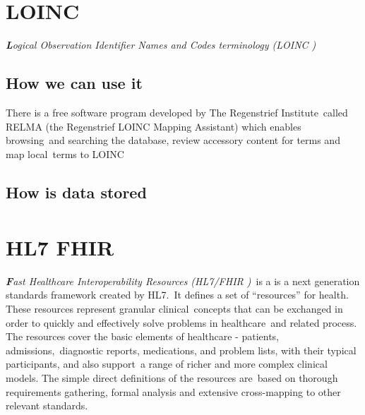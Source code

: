\documentclass[DIV=calc, paper=a4, fontsize=12pt, onecolumn]{scrartcl}	 %
\newcommand{\initial}[1]{ %
\lettrine[lines=3,lhang=0.3,nindent=0em,slope=0em]{
\color{DarkBlue}
{\textbf{\textit{#1}}}}{}}
\begin{document}
  \section[Logical Observation Identifier Names and Codes terminology\
  (LOINC\textsuperscript{\textregistered})] 
  {LOINC\textsuperscript{\textregistered}}
  \label{sec:loinc}
  
  \initial{L}\textit{ogical Observation Identifier Names and Codes terminology (LOINC )}\\



  \subsection{How we can use it}

  There is a free software program developed by The Regenstrief Institute\
  called RELMA (the Regenstrief LOINC Mapping Assistant) which enables browsing\
  and searching the database, review accessory content for terms and map local\
  terms to LOINC \citep{kroth_using_2012} 

  \subsection{How is data stored}


  \section[Fast Healthcare Interoperability Resources (HL7 FHIR\textsuperscript{\texttrademark})]
  {HL7 FHIR \textsuperscript{\texttrademark}}
    \label{sec:fhir}

  \initial{F}\textit{ast Healthcare Interoperability Resources (HL7/FHIR )}\
  is a is a next generation standards framework created by HL7.\
  It defines a set of ``resources'' for health. These resources represent granular clinical\
  concepts that can be exchanged in order to quickly and effectively solve problems in healthcare\
  and related process. The resources cover the basic elements of healthcare - patients, admissions,\
  diagnostic reports, medications, and problem lists, with their typical participants, and also support\
  a range of richer and more complex clinical models. The simple direct definitions of the resources are\
  based on thorough requirements gathering, formal analysis and extensive cross-mapping to other relevant standards. \citep{_fhir_intro_2013}\
\end{document}
